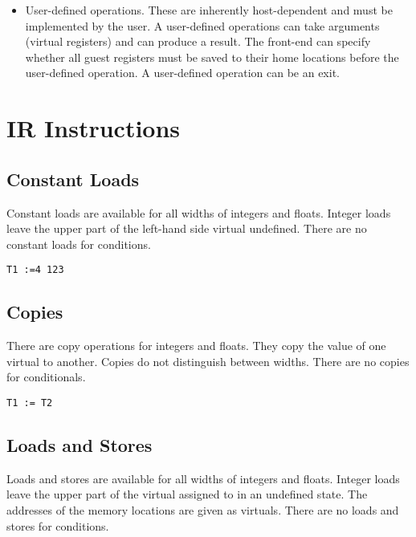 \documentclass{article}
\begin{document}
\begin{itemize}
\item User-defined operations.  These are inherently host-dependent and
    must be implemented by the user.
    A user-defined operations can take arguments (virtual registers)
    and can produce a result.  The front-end can specify whether all
    guest registers must be saved to their home locations before the
    user-defined operation.  A user-defined operation can be an exit.
\end{itemize}

\section{IR Instructions}

\subsection{Constant Loads}

Constant loads are available for all widths of integers and floats.
Integer loads leave the upper part of the left-hand side virtual
undefined.  There are no constant loads for conditions.

\begin{verbatim}
T1 :=4 123
\end{verbatim}

\subsection{Copies}

There are copy operations for integers and floats.  They copy the
value of one virtual to another.  Copies do not distinguish between
widths.  There are no copies for conditionals.

\begin{verbatim}
T1 := T2
\end{verbatim}

\subsection{Loads and Stores}

Loads and stores are available for all widths of integers and floats.
Integer loads leave the upper part of the virtual assigned to in an
undefined state.  The addresses of the memory locations are given as
virtuals.  There are no loads and stores for conditions.
\end{document}
